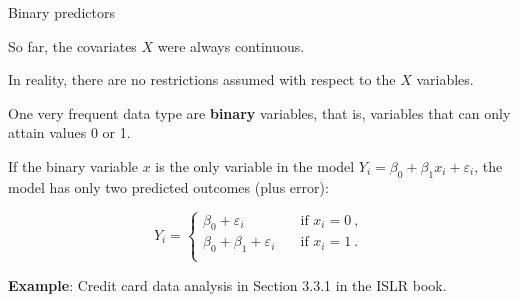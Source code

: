 \documentclass[
  10pt,
  ignorenonframetext,
]{beamer}
\begin{document}
\begin{frame}
\begin{block}{Binary predictors}
\protect\hypertarget{binary-predictors}{}
\(~\)

So far, the covariates \(X\) were always continuous.\\
\vspace{2mm}

In reality, there are no restrictions assumed with respect to the \(X\)
variables. \vspace{2mm}

One very frequent data type are \textbf{binary} variables, that is,
variables that can only attain values 0 or 1. \vspace{4mm}

If the binary variable \(x\) is the only variable in the model
\(Y_i = \beta_0 + \beta_1 x_i + \varepsilon_i\), the model has only two
predicted outcomes (plus error):

\begin{equation*}
Y_i = \left\{ 
\begin{array}{ll}
 \beta_0  + \varepsilon_i \quad &\text{if } x_i=0 \ , \\
 \beta_0 + \beta_1 + \varepsilon_i \quad &\text{if } x_i =1 \ .\\
\end{array}
\right .
\end{equation*}

\vspace{4mm}

\textbf{Example}: Credit card data analysis in Section 3.3.1 in the ISLR
book.
\end{block}
\end{frame}
\end{document}
